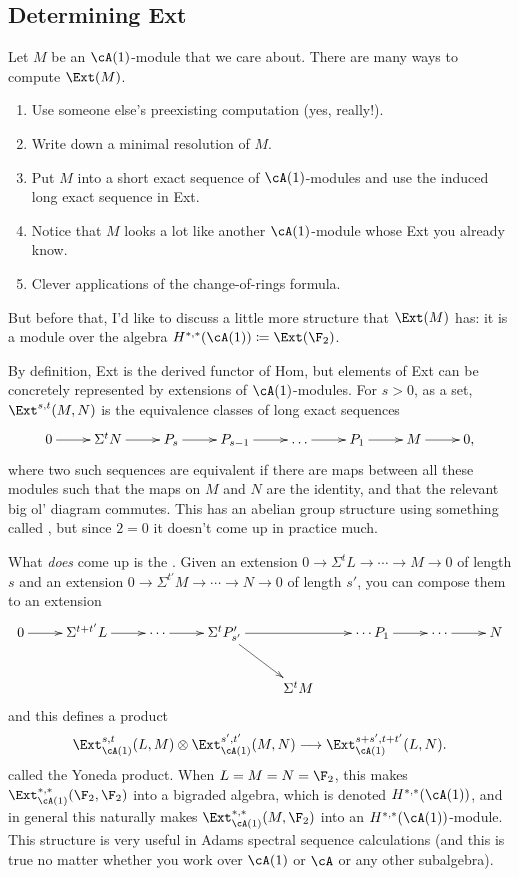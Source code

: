 \subsection{Determining Ext}
Let $M$ be an $\cA(1)$-module that we care about. There are many ways to compute $\Ext(M)$.
\begin{enumerate}
	\item\label{look_it_up} Use someone else's preexisting computation (yes, really!).
	\item\label{min_res} Write down a minimal resolution of $M$.
	\item\label{SES_LES} Put $M$ into a short exact sequence of $\cA(1)$-modules and use the induced long exact
	sequence in Ext.
	\item\label{kernel_method} Notice that $M$ looks a lot like another $\cA(1)$-module whose Ext you already know.
	\item\label{apply_CoR} Clever applications of the change-of-rings formula.
\end{enumerate}
But before that, I'd like to discuss a little more structure that $\Ext(M)$ has: it is a module over the algebra
$H^{*,*}(\cA(1))\coloneqq \Ext(\F_2)$.

By definition, Ext is the derived functor of Hom, but elements of Ext can be concretely represented by extensions
of $\cA(1)$-modules. For $s > 0$, as a set, $\Ext^{s,t}(M, N)$ is the equivalence classes of long exact sequences
\begin{equation}
	\xymatrix{0\ar[r] & \Sigma^t N\ar[r] & P_s\ar[r] & P_{s-1}\ar[r] & \dots\ar[r] & P_1\ar[r] & M\ar[r] & 0,}
\end{equation}
where two such sequences are equivalent if there are maps between all these modules such that the maps on $M$ and
$N$ are the identity, and that the relevant big ol' diagram commutes. This has an abelian group structure using
something called , but since $2 = 0$ it doesn't come up in practice much.

What \emph{does} come up is the . Given an extension $0\to \Sigma^tL\to\dotsb \to M\to 0$ of
length $s$ and an extension $0\to \Sigma^{t'}M\to \dotsb\to N\to 0$ of length $s'$, you can compose them to an
extension
\begin{equation}
	\xymatrix{
		0\ar[r] & \Sigma^{t+t'}L\ar[r] & \dotsb\ar[r] & \Sigma^t P'_{s'}\ar[dr]\ar[rr] && \dotsb P_1\ar[r] &
		\dotsb\ar[r] & N\\
		&&&& \Sigma^t M
	}
\end{equation}
and this defines a product
\begin{equation}
	\Ext_{\cA(1)}^{s,t}(L, M)\otimes \Ext_{\cA(1)}^{s',t'}(M, N)\longrightarrow \Ext_{\cA(1)}^{s+s', t+t'}(L, N).
\end{equation}
called the Yoneda product. When $L = M = N = \F_2$, this makes $\Ext_{\cA(1)}^{*,*}(\F_2, \F_2)$ into a bigraded
algebra, which is denoted $H^{*,*}(\cA(1))$, and in general this naturally makes $\Ext_{\cA(1)}^{*,*}(M, \F_2)$
into an $H^{*,*}(\cA(1))$-module. This structure is very useful in Adams spectral sequence calculations (and this
is true no matter whether you work over $\cA(1)$ or $\cA$ or any other subalgebra).

